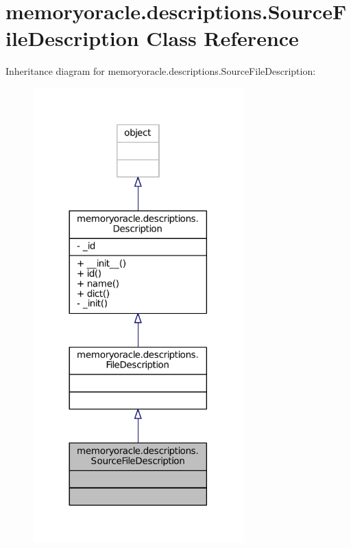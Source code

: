 \hypertarget{classmemoryoracle_1_1descriptions_1_1SourceFileDescription}{}\section{memoryoracle.\+descriptions.\+Source\+File\+Description Class Reference}
\label{classmemoryoracle_1_1descriptions_1_1SourceFileDescription}


Inheritance diagram for memoryoracle.\+descriptions.\+Source\+File\+Description\+:\nopagebreak
\begin{figure}[H]
\begin{center}
\leavevmode
\includegraphics[width=230pt]{classmemoryoracle_1_1descriptions_1_1SourceFileDescription__inherit__graph}
\end{center}
\end{figure}


